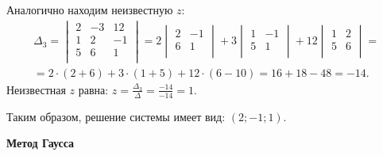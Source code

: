\documentclass[10pt]{article}
\numberwithin{primer}{section}
\numberwithin{equation}{section}
\begin{document}
Аналогично находим неизвестную $z$:
\begin{multline*}
\Delta_3 = \begin{vmatrix}
2 & -3 & 12 \\
1 & 2 & -1 \\
5 & 6 & 1 \\
\end{vmatrix}=2\begin{vmatrix}
2 & -1 \\
6 & 1 \\
\end{vmatrix}+3\begin{vmatrix}
1 & -1 \\
5 & 1 \\
\end{vmatrix}+12\begin{vmatrix}
1 & 2 \\
5 & 6 \\
\end{vmatrix}=\\
=2\cdot(2+6)+3\cdot(1+5)+12\cdot(6-10)=16+18-48=-14.
\end{multline*}
Неизвестная $z$ равна: $z=\tfrac{\Delta_3}{\Delta}=\tfrac{-14}{-14}=1$.

Таким образом, решение системы имеет вид: $\left(2;-1;1\right)$.

\begin{center}
	\textbf{Метод Гаусса}
\end{center}
\end{document}
